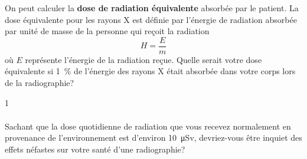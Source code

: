 \documentclass{tufte-handout}
\def\reponse{0}
\begin{document}
On peut calculer la \textbf{dose de radiation équivalente} absorbée par le
patient. La dose équivalente pour les rayons X est définie par l'énergie de
radiation absorbée par unité de masse de la personne qui reçoit la radiation
\[ H = \frac{E}{m} \]
où $E$ représente l'énergie de la radiation reçue. Quelle serait votre dose
équivalente si \SI{1}{\percent} de l'énergie des rayons X était absorbée dans
votre corps lors de la radiographie?

\if\reponse1
  {\color{tblue}
    \begin{align*}
    \end{align*}
  }
\else
  \vspace{3cm}
\fi

Sachant que la dose quotidienne de radiation que vous recevez normalement en
provenance de l'environnement est d'environ \SI{10}{\micro\sievert},
devriez-vous être inquiet des effets néfastes sur votre santé d'une
radiographie?
\end{document}
